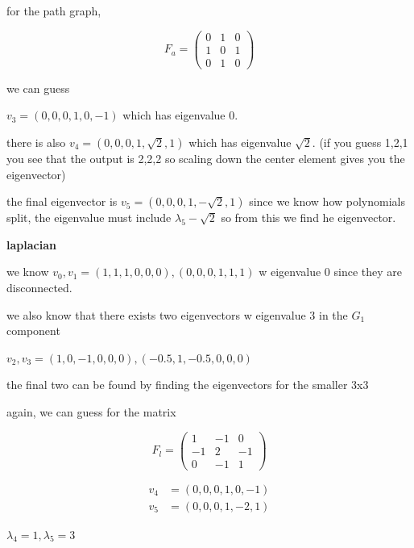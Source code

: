 \documentclass{article}
\begin{document}
\begin{enumerate}
  for the path graph, 

  \begin{equation}
    F_a = \begin{pmatrix}
    0 & 1 & 0\\
    1& 0 &1\\
    0&1&0
    \end{pmatrix}
  \end{equation}

  we can guess 

  \(v_3 = (0,0,0,1,0,-1)\) which has eigenvalue 0. 

  there is also \(v_4 = (0,0,0,1,\sqrt{2},1)\) which has eigenvalue \(\sqrt{2}\). (if you guess 1,2,1 you see that the output is 2,2,2 so scaling down the center element gives you the eigenvector)

  the final eigenvector is \(v_5 = (0,0,0,1,-\sqrt{2},1)\) since we know how polynomials split, the eigenvalue must include \(\lambda_5-\sqrt{2}\) so from this we find he eigenvector.


  \textbf{laplacian}

  we know \(v_0,v_1 = (1,1,1,0,0,0), (0,0,0,1,1,1)\) w eigenvalue 0 since they are disconnected. 

  we also know that there exists two eigenvectors w eigenvalue \(3\) in the \(G_1\) component 

  \(v_2,v_3 = (1,0,-1,0,0,0), (-0.5,1,-0.5,0,0,0)\)

  the final two can be found by finding the eigenvectors for the smaller 3x3 

  again, we can guess for the matrix 

  \begin{equation}
    F_l = \begin{pmatrix}
    1 & -1 & 0\\
    -1& 2 &-1\\
    0&-1&1
    \end{pmatrix}
  \end{equation}

  \begin{equation}
    \begin{split}
      v_4 &= (0,0,0,1,0,-1)\\
      v_5 &= (0,0,0,1,-2,1)
    \end{split}
  \end{equation}

  \(\lambda_4 = 1, \lambda_5 = 3\)

  
\end{enumerate}
\end{document}
